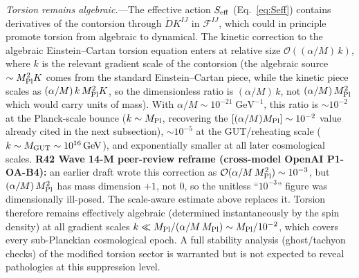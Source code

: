 \documentclass[aps,prd,twocolumn,superscriptaddress,showpacs,preprintnumbers,nofootinbib,longbibliography,floatfix]{revtex4-2}
\newcommand{\MPl}{M_{\rm Pl}}
\begin{document}
\textit{Torsion remains algebraic.}---The effective action $S_{\rm eff}$ (Eq.~\ref{eq:Seff}) contains derivatives of the contorsion through $\mathring{D}K^{IJ}$ in $\mathcal{F}^{IJ}$, which could in principle promote torsion from algebraic to dynamical. The kinetic correction to the algebraic Einstein--Cartan torsion equation enters at relative size $\mathcal{O}\!\left((\alpha/M)\,k\right)$, where $k$ is the relevant gradient scale of the contorsion (the algebraic source $\sim\MPl^2 K$ comes from the standard Einstein--Cartan piece, while the kinetic piece scales as $(\alpha/M)\,k\,\MPl^2 K$, so the dimensionless ratio is $(\alpha/M)\,k$, not $(\alpha/M)\,\MPl^2$ which would carry units of mass). With $\alpha/M\sim 10^{-21}\;\text{GeV}^{-1}$, this ratio is $\sim 10^{-2}$ at the Planck-scale bounce ($k\sim\MPl$, recovering the $[(\alpha/M)\MPl]\sim 10^{-2}$ value already cited in the next subsection), $\sim 10^{-5}$ at the GUT/reheating scale ($k\sim M_{\rm GUT}\sim 10^{16}\,\text{GeV}$), and exponentially smaller at all later cosmological scales. \textbf{R42 Wave 14-M peer-review reframe (cross-model OpenAI P1-OA-B4):} an earlier draft wrote this correction as $\mathcal{O}(\alpha/M\,\MPl^2)\sim 10^{-3}$, but $(\alpha/M)\,\MPl^2$ has mass dimension $+1$, not $0$, so the unitless ``$10^{-3}$'' figure was dimensionally ill-posed. The scale-aware estimate above replaces it. Torsion therefore remains effectively algebraic (determined instantaneously by the spin density) at all gradient scales $k\ll \MPl/(\alpha/M\,\MPl)\sim\MPl/10^{-2}$, which covers every sub-Planckian cosmological epoch. A full stability analysis (ghost/tachyon checks) of the modified torsion sector is warranted but is not expected to reveal pathologies at this suppression level.
\end{document}
